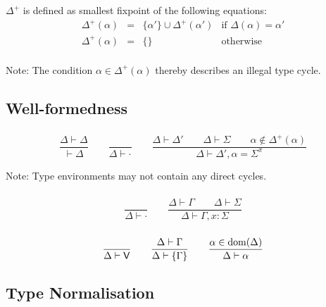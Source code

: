 \documentclass[10pt,a4paper]{article}
\newcommand\ff[1]{\ensuremath{\mathbin{\mathrm{#1\null}}}\xspace}
\newcommand\y[1]{\ensuremath{\mathsf{#1}}\xspace}
\newcommand\dom{\ff{dom}}
\newcommand\note[1]{\noindent #1}
\begin{document}
$\Delta^+$ is defined as smallest fixpoint of the following equations:
$$
\begin{array}{rcll}
\Delta^+(\alpha) &=& \{\alpha'\} \cup \Delta^+(\alpha') &\mbox{if $\Delta(\alpha) = \alpha'$} \\
\Delta^+(\alpha) &=& \{\} &\mbox{otherwise} \\
\end{array}
$$

\note{
Note: The condition $\alpha \in \Delta^+(\alpha)$ thereby describes an illegal type cycle.
}


\subsection*{Well-formedness}

\subsubsection*{\fbox{$\vdash \Delta$} \fbox{$\Delta \vdash \Delta$}}

$$
\frac{
  \Delta \vdash \Delta
}{
  \vdash \Delta
}
\qquad
\frac{
}{
  \Delta \vdash {\cdot}
}
\qquad
\frac{
  \Delta \vdash \Delta'
  \qquad
  \Delta \vdash \Sigma
  \qquad
  \alpha \notin \Delta^+(\alpha)
}{
  \Delta \vdash \Delta', \alpha{=}\Sigma^\pi
}
$$

\note{
Note: Type environments may not contain any direct cycles.
}


\subsubsection*{\fbox{$\Delta \vdash \Gamma$}}

$$
\frac{
}{
  \Delta \vdash {\cdot}
}
\qquad
\frac{
  \Delta \vdash \Gamma
  \qquad
  \Delta \vdash \Sigma
}{
  \Delta \vdash \Gamma, x{:}\Sigma
}
$$

\subsubsection*{\fbox{$\Delta \vdash \Sigma$}}

$$
\frac{
}{
  \Delta \vdash \y{V}
}
\qquad
\frac{
  \Delta \vdash \Gamma
}{
  \Delta \vdash \{\Gamma\}
}
\qquad
\frac{
  \alpha \in \dom(\Delta)
}{
  \Delta \vdash \alpha
}
$$


\subsection*{Type Normalisation}
\end{document}
